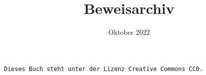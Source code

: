 \documentclass[a4paper,10pt,fleqn,twoside]{scrbook}
\title{Beweisarchiv}
\date{Oktober 2022}
\numberwithin{equation}{chapter}
\theoremstyle{rmbox}
\begin{document}
\setlength{\baselineskip}{13pt}

\maketitle

\texttt{Dieses Buch steht unter der Lizenz Creative Commons CC0.}

\tableofcontents










\setlength{\baselineskip}{12pt}
\printindex
\end{document}
